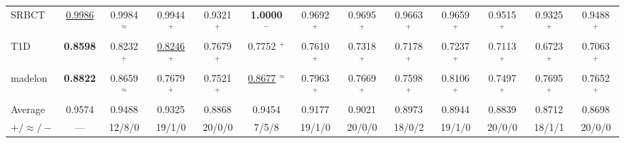 \begin{table}[t]
{\begin{tabular}{lcccccccccccc}
SRBCT            & \underline{0.9986} & 0.9984 $^{\approx}$ & 0.9944 $^{+}$ & 0.9321 $^{+}$ & \textbf{1.0000} $^{-}$ & 0.9692 $^{+}$ & 0.9695 $^{+}$ & 0.9663 $^{+}$ & 0.9659 $^{+}$ & 0.9515 $^{+}$ & 0.9325 $^{+}$ & 0.9488 $^{+}$ \\
T1D              & \textbf{0.8598} & 0.8232 $^{+}$ & \underline{0.8246} $^{+}$ & 0.7679 $^{+}$ & 0.7752 $^{+}$ & 0.7610 $^{+}$ & 0.7318 $^{+}$ & 0.7178 $^{+}$ & 0.7237 $^{+}$ & 0.7113 $^{+}$ & 0.6723 $^{+}$ & 0.7063 $^{+}$ \\
madelon          & \textbf{0.8822} & 0.8659 $^{\approx}$ & 0.7679 $^{+}$ & 0.7521 $^{+}$ & \underline{0.8677} $^{\approx}$ & 0.7963 $^{+}$ & 0.7669 $^{+}$ & 0.7598 $^{+}$ & 0.8106 $^{+}$ & 0.7497 $^{+}$ & 0.7695 $^{+}$ & 0.7652 $^{+}$ \\
\midrule
Average          & 0.9574 & 0.9488 & 0.9325 & 0.8868 & 0.9454 & 0.9177 & 0.9021 & 0.8973 & 0.8944 & 0.8839 & 0.8712 & 0.8698 \\
$+ / \approx / -$ & — & 12/8/0 & 19/1/0 & 20/0/0 & 7/5/8 & 19/1/0 & 20/0/0 & 18/0/2 & 19/1/0 & 20/0/0 & 18/1/1 & 20/0/0 \\
\bottomrule
\end{tabular}
}
\end{table}
